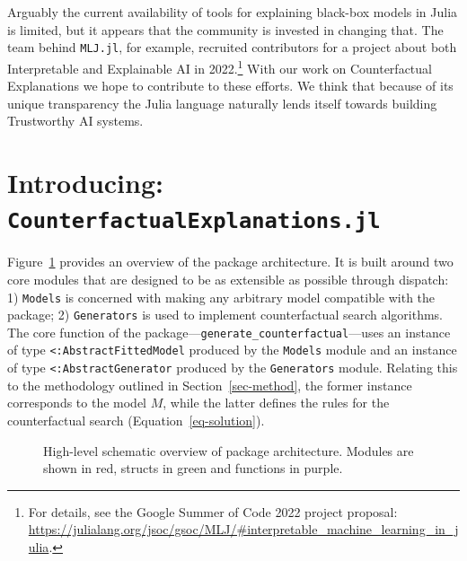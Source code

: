 \documentclass{juliacon}
\begin{document}
Arguably the current availability of tools for explaining black-box
models in Julia is limited, but it appears that the community is
invested in changing that. The team behind \texttt{MLJ.jl}, for example,
recruited contributors for a project about both Interpretable and
Explainable AI in 2022.\footnote{For details, see the Google Summer of
  Code 2022 project proposal:
  \url{https://julialang.org/jsoc/gsoc/MLJ/\#interpretable_machine_learning_in_julia}.}
With our work on Counterfactual Explanations we hope to contribute to
these efforts. We think that because of its unique transparency the
Julia language naturally lends itself towards building Trustworthy AI
systems.

\section{\texorpdfstring{Introducing:
\texttt{CounterfactualExplanations.jl}}{Introducing: CounterfactualExplanations.jl}}\label{sec-arch}

Figure~\ref{fig-arch} provides an overview of the package architecture.
It is built around two core modules that are designed to be as
extensible as possible through dispatch: 1) \texttt{Models} is concerned
with making any arbitrary model compatible with the package; 2)
\texttt{Generators} is used to implement counterfactual search
algorithms. The core function of the
package---\texttt{generate\_counterfactual}---uses an instance of type
\texttt{\textless{}:AbstractFittedModel} produced by the \texttt{Models}
module and an instance of type \texttt{\textless{}:AbstractGenerator}
produced by the \texttt{Generators} module. Relating this to the
methodology outlined in Section~\ref{sec-method}, the former instance
corresponds to the model \(M\), while the latter defines the rules for
the counterfactual search (Equation~\ref{eq-solution}).

\begin{figure}


\caption{\label{fig-arch}High-level schematic overview of package
architecture. Modules are shown in red, structs in green and functions
in purple.}

\end{figure}%
\end{document}
